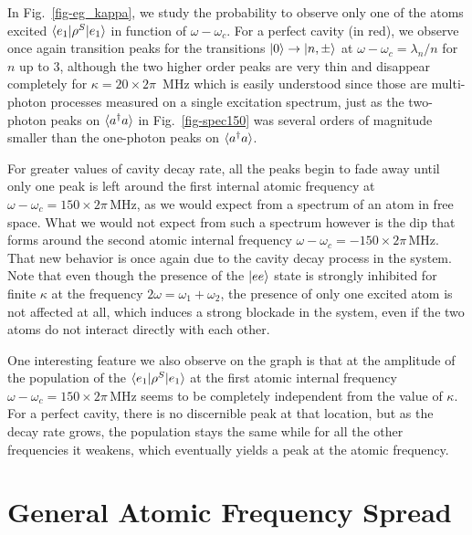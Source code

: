 In Fig.~\ref{fig-eg_kappa}, we study the probability to observe only one of the atoms excited $\langle e_1 | \rho^S | e_1 \rangle$ in function of $\omega-\omega_c$. For a perfect cavity (in red), we observe once again transition peaks for the transitions $| 0 \rangle \rightarrow | n,\pm \rangle$ at $\omega-\omega_c=\lambda_n/n$ for $n$ up to 3, although the two higher order peaks are very thin and disappear completely for $\kappa=20\times 2\pi$~MHz which is easily understood since those are multi-photon processes measured on a single excitation spectrum, just as the two-photon peaks on $\langle a^\dagger a \rangle$ in Fig.~\ref{fig-spec150} was several orders of magnitude smaller than the one-photon peaks on $\langle a^\dagger a \rangle$.

For greater values of cavity decay rate, all the peaks begin to fade away until only one peak is left around the first internal atomic frequency at $\omega - \omega_c = 150 \times 2\pi\,\mbox{MHz}$, as we would expect from a spectrum of an atom in free space. What we would not expect from such a spectrum however is the dip that forms around the second atomic internal frequency  $\omega - \omega_c = -150 \times 2\pi\,\mbox{MHz}$. That new behavior is once again due to the cavity decay process in the system. Note that even though the presence of the $| ee \rangle$ state is strongly inhibited for finite $\kappa$ at the frequency $2\omega=\omega_1+\omega_2$, the presence of only one excited atom is not affected at all, which induces a strong blockade in the system, even if the two atoms do not interact directly with each other.

One interesting feature we also observe on the graph is that at the amplitude of the population of the $\langle e_1 | \rho^S | e_1 \rangle$ at the first atomic internal frequency $\omega - \omega_c = 150 \times 2\pi\,\mbox{MHz}$ seems to be completely independent from the value of $\kappa$. For a perfect cavity, there is no discernible peak at that location, but as the decay rate grows, the population stays the same while for all the other frequencies it weakens, which eventually yields a peak at the atomic frequency.



\section{General Atomic Frequency Spread}  \label{sec-phi}

